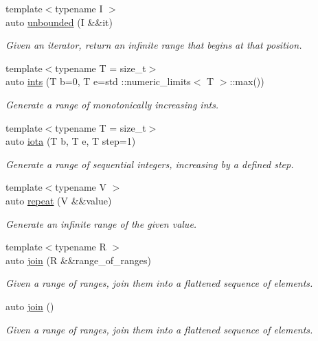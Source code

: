 \begin{DoxyCompactItemize}
{\footnotesize template$<$typename I $>$ }\\auto \mbox{\hyperlink{namespacerah_1_1view_a4a484f6d91dbf5795a4c60693c560592}{unbounded}} (I \&\&it)
\begin{DoxyCompactList}\small\item\em Given an iterator, return an infinite range that begins at that position. \end{DoxyCompactList}\item 
{\footnotesize template$<$typename T  = size\+\_\+t$>$ }\\auto \mbox{\hyperlink{namespacerah_1_1view_a215e11ea5b9b06b56a794410e4285976}{ints}} (T b=0, T e=std \+::numeric\+\_\+limits$<$ T $>$\+::max())
\begin{DoxyCompactList}\small\item\em Generate a range of monotonically increasing ints. \end{DoxyCompactList}\item 
{\footnotesize template$<$typename T  = size\+\_\+t$>$ }\\auto \mbox{\hyperlink{namespacerah_1_1view_ae66c3be408888c58118b1974cdece592}{iota}} (T b, T e, T step=1)
\begin{DoxyCompactList}\small\item\em Generate a range of sequential integers, increasing by a defined step. \end{DoxyCompactList}\item 
{\footnotesize template$<$typename V $>$ }\\auto \mbox{\hyperlink{namespacerah_1_1view_abd22c411fe9e0bea622ba7f829743362}{repeat}} (V \&\&value)
\begin{DoxyCompactList}\small\item\em Generate an infinite range of the given value. \end{DoxyCompactList}\item 
{\footnotesize template$<$typename R $>$ }\\auto \mbox{\hyperlink{namespacerah_1_1view_a4446e090b4ab3d5bb7418b7ee79532b8}{join}} (R \&\&range\+\_\+of\+\_\+ranges)
\begin{DoxyCompactList}\small\item\em Given a range of ranges, join them into a flattened sequence of elements. \end{DoxyCompactList}\item 
auto \mbox{\hyperlink{namespacerah_1_1view_a1ae330f27898b3e012d519e7cd5814bb}{join}} ()
\begin{DoxyCompactList}\small\item\em Given a range of ranges, join them into a flattened sequence of elements. \end{DoxyCompactList}\item 

\end{DoxyCompactItemize}
